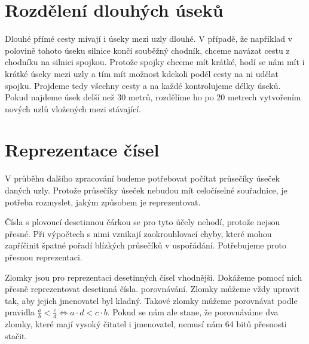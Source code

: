 \section{Rozdělení dlouhých úseků}
Dlouhé přímé cesty mívají i úseky mezi uzly dlouhé. V případě, že například v
polovině tohoto úseku silnice končí souběžný chodník, chceme navázat cestu z
chodníku na silnici spojkou. Protože spojky chceme mít krátké, hodí se nám mít i
krátké úseky mezi uzly a tím mít možnost kdekoli podél cesty na ni udělat
spojku. Projdeme tedy všechny cesty a na každé kontrolujeme délky úseků. Pokud
najdeme úsek delší než 30 metrů, rozdělíme ho po 20 metrech vytvořením nových
uzlů vložených mezi stávající.

\section{Reprezentace čísel}
V průběhu dalšího zpracování budeme potřebovat počítat průsečíky úseček daných
uzly. Protože průsečíky úseček nebudou mít celočíselné souřadnice, je potřeba
rozmyslet, jakým způsobem je reprezentovat.

{\tuc Čísla s plovoucí desetinnou čárkou} se pro tyto účely nehodí, protože
nejsou přesné. Při výpočtech s nimi vznikají zaokrouhlovací chyby, které mohou
zapříčinit špatné pořadí blízkých průsečíků v uspořádání. Potřebujeme proto
přesnou reprezentaci.

{\tuc Zlomky} jsou pro reprezentaci desetinných čísel vhodnější. Dokážeme pomocí
nich přesně reprezentovat desetinná čísla.  porovnávání. Zlomky můžeme vždy
upravit tak, aby jejich jmenovatel byl kladný.  Takové zlomky můžeme porovnávat
podle pravidla $\frac{a}{b} < \frac{c}{d} \Leftrightarrow a\cdot d < c\cdot b $. 
Pokud se nám ale stane, že porovnáváme dva zlomky, které mají vysoký čitatel i
jmenovatel, nemusí nám 64 bitů přesnosti stačit.

